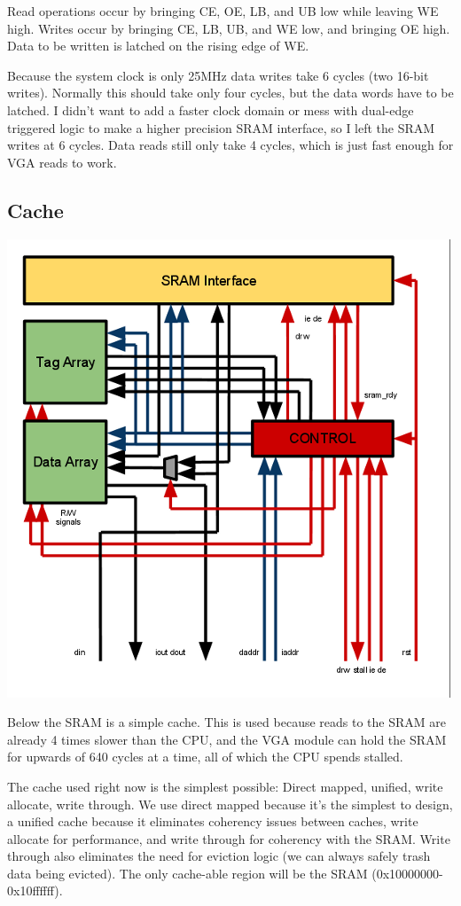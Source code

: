 \documentclass{article}
\begin{document}
Read operations occur by bringing CE, OE, LB, and UB low while leaving WE high. Writes occur by bringing CE, LB, UB, and WE low, and bringing OE high. Data to be written is latched on the rising edge of WE.

Because the system clock is only 25MHz data writes take 6 cycles (two 16-bit writes). Normally this should take only four cycles, but the data words have to be latched. I didn't want to add a faster clock domain or mess with dual-edge triggered logic to make a higher precision SRAM interface, so I left the SRAM writes at 6 cycles. Data reads still only take 4 cycles, which is just fast enough for VGA reads to work.

\subsection{Cache}

\includegraphics[scale=0.6]{../../images/CACHE.png} 

Below the SRAM is a simple cache. This is used because reads to the SRAM are already 4 times slower than the CPU, and the VGA module can hold the SRAM for upwards of 640 cycles at a time, all of which the CPU spends stalled.

The cache used right now is the simplest possible: Direct mapped, unified, write allocate, write through. We use direct mapped because it's the simplest to design, a unified cache because it eliminates coherency issues between caches, write allocate for performance, and write through for coherency with the SRAM. Write through also eliminates the need for eviction logic (we can always safely trash data being evicted). The only cache-able region will be the SRAM (0x10000000-0x10ffffff).
\end{document}
